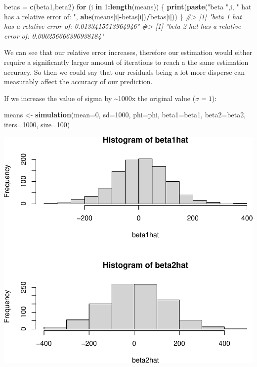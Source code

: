 \documentclass[]{article}
\newenvironment{Shaded}{\begin{snugshade}}{\end{snugshade}}
\newcommand{\CommentTok}[1]{\textcolor[rgb]{0.56,0.35,0.01}{\textit{#1}}}
\newcommand{\ControlFlowTok}[1]{\textcolor[rgb]{0.13,0.29,0.53}{\textbf{#1}}}
\newcommand{\DataTypeTok}[1]{\textcolor[rgb]{0.13,0.29,0.53}{#1}}
\newcommand{\DecValTok}[1]{\textcolor[rgb]{0.00,0.00,0.81}{#1}}
\newcommand{\KeywordTok}[1]{\textcolor[rgb]{0.13,0.29,0.53}{\textbf{#1}}}
\newcommand{\NormalTok}[1]{#1}
\newcommand{\OperatorTok}[1]{\textcolor[rgb]{0.81,0.36,0.00}{\textbf{#1}}}
\newcommand{\StringTok}[1]{\textcolor[rgb]{0.31,0.60,0.02}{#1}}
\begin{document}
\begin{Shaded}
\begin{Highlighting}[]
\NormalTok{betas =}\StringTok{ }\KeywordTok{c}\NormalTok{(beta1,beta2)}
\ControlFlowTok{for}\NormalTok{ (i }\ControlFlowTok{in} \DecValTok{1}\OperatorTok{:}\KeywordTok{length}\NormalTok{(means)) \{}
    \KeywordTok{print}\NormalTok{(}\KeywordTok{paste}\NormalTok{(}\StringTok{"beta "}\NormalTok{,i, }\StringTok{" hat has a relative error of: "}\NormalTok{, }\KeywordTok{abs}\NormalTok{(means[i]}\OperatorTok{-}\NormalTok{betas[i])}\OperatorTok{/}\NormalTok{betas[i]))}
\NormalTok{\}}
\CommentTok{#> [1] "beta  1  hat has a relative error of:  0.0133415513964946"}
\CommentTok{#> [1] "beta  2  hat has a relative error of:  0.000256666396938184"}
\end{Highlighting}
\end{Shaded}

We can see that our relative error increases, therefore our estimation
would either require a significantly larger amount of iterations to
reach a the same estimation accuracy. So then we could say that our
residuals being a lot more disperse can measurably affect the accuracy
of our prediction.

\newpage

If we increase the value of sigma by \textasciitilde{}1000x the original
value (\(\sigma = 1\)):

\begin{Shaded}
\begin{Highlighting}[]
\NormalTok{means <-}\StringTok{ }\KeywordTok{simulation}\NormalTok{(}\DataTypeTok{mean=}\DecValTok{0}\NormalTok{, }\DataTypeTok{sd=}\DecValTok{1000}\NormalTok{, }\DataTypeTok{phi=}\NormalTok{phi, }\DataTypeTok{beta1=}\NormalTok{beta1, }\DataTypeTok{beta2=}\NormalTok{beta2, }\DataTypeTok{iters=}\DecValTok{1000}\NormalTok{, }\DataTypeTok{size=}\DecValTok{100}\NormalTok{)}
\end{Highlighting}
\end{Shaded}

\includegraphics{./figures/unnamed-chunk-10-1.pdf}
\end{document}
